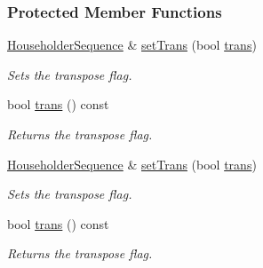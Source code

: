 \subsubsection*{Protected Member Functions}
\begin{DoxyCompactItemize}
\item 
\hyperlink{group___householder___module_class_eigen_1_1_householder_sequence}{Householder\+Sequence} \& \hyperlink{group___householder___module_ab8a9c969a9adcd392c9d481d6e9ccaef}{set\+Trans} (bool \hyperlink{group___householder___module_ad61c9b10d95c26b7397ccb47f4d80b08}{trans})
\begin{DoxyCompactList}\small\item\em Sets the transpose flag. \end{DoxyCompactList}\item 
\mbox{\label{group___householder___module_ad61c9b10d95c26b7397ccb47f4d80b08}} 
bool \hyperlink{group___householder___module_ad61c9b10d95c26b7397ccb47f4d80b08}{trans} () const
\begin{DoxyCompactList}\small\item\em Returns the transpose flag. \end{DoxyCompactList}\item 
\hyperlink{group___householder___module_class_eigen_1_1_householder_sequence}{Householder\+Sequence} \& \hyperlink{group___householder___module_ab8a9c969a9adcd392c9d481d6e9ccaef}{set\+Trans} (bool \hyperlink{group___householder___module_ad61c9b10d95c26b7397ccb47f4d80b08}{trans})
\begin{DoxyCompactList}\small\item\em Sets the transpose flag. \end{DoxyCompactList}\item 
\mbox{\label{group___householder___module_ad61c9b10d95c26b7397ccb47f4d80b08}} 
bool \hyperlink{group___householder___module_ad61c9b10d95c26b7397ccb47f4d80b08}{trans} () const
\begin{DoxyCompactList}\small\item\em Returns the transpose flag. \end{DoxyCompactList}\end{DoxyCompactItemize}

